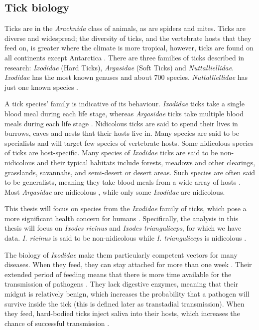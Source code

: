 \documentclass{article}
\begin{document}
\subsection{Tick biology}

Ticks are in the \textit{Arachnida} class of animals, as are spiders and mites. Ticks are diverse and widespread; the diversity of ticks, and the vertebrate hosts that they feed on, is greater where the climate is more tropical, however, ticks are found on all continents except Antarctica \cite{Johnson2023a}. There are three families of ticks described in research: \textit{Ixodidae} (Hard Ticks), \textit{Argasidae} (Soft Ticks) and \textit{Nuttalliellidae}. \textit{Ixodidae} has the most known genuses and about 700 species. \textit{Nuttalliellidae} has just one known species \cite{Nicholson2019}.

A tick species' family is indicative of its behaviour. \textit{Ixodidae} ticks take a single blood meal during each life stage, whereas \textit{Argasidae} ticks take multiple blood meals during each life stage \cite{Johnson2023d}. Nidicolous ticks are said to spend their lives in burrows, caves and nests that their hosts live in. Many species are said to be specialists and will target few species of vertebrate hosts. Some nidicolous species of ticks are host-specific. Many species of \textit{Ixodidae} ticks are said to be non-nidicolous and their typical habitats include forests, meadows and other clearings, grasslands, savannahs, and semi-desert or desert areas. Such species are often said to be generalists, meaning they take blood meals from a wide array of hosts \cite{Nicholson2019}. Most \textit{Argasidae} are nidicolous \cite{Vial2009}, while only some \textit{Ixodidae} are nidicolous. 

This thesis will focus on species from the \textit{Ixodidae} family of ticks, which pose a more significant health concern for humans \cite{Parola2001}. Specifically, the analysis in this thesis will focus on \textit{Ixodes ricinus} and \textit{Ixodes trianguliceps}, for which we have data. \textit{I. ricinus} is said to be non-nidicolous while \textit{I. trianguliceps} is nidicolous \cite{Nicholson2019}.

The biology of \textit{Ixodidae} make them particularly competent vectors for many diseases. When they feed, they can stay attached for more than one week \cite{Johnson2023b}. Their extended period of feeding means that there is more time available for the transmission of pathogens \cite{Gray2024}. They lack digestive enzymes, meaning that their midgut is relatively benign, which increases the probability that a pathogen will survive inside the tick (this is defined later as transtadial transmission). When they feed, hard-bodied ticks inject saliva into their hosts, which increases the chance of successful transmission \cite{Gray2024}.
\end{document}
